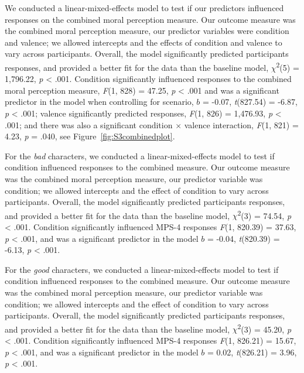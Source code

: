 \documentclass[
  man,floatsintext]{apa6}
\begin{document}
We conducted a linear-mixed-effects model to test if our predictors influenced responses on the combined moral perception measure. Our outcome measure was the combined moral perception measure, our predictor variables were condition and valence; we allowed intercepts and the effects of condition and valence to vary across participants.
Overall, the model significantly predicted participants responses, and provided a better fit for the data than the baseline model,
\(\chi\)\textsuperscript{2}(5) = 1,796.22, \emph{p} \textless{} .001.
Condition significantly influenced responses to the combined moral perception measure,
\emph{F}(1, 828) = 47.25, \emph{p} \textless{} .001
and was a significant predictor in the model when controlling for scenario, \(b\) = -0.07, \emph{t}(827.54) = -6.87, \emph{p} \textless{} .001;
valence significantly predicted responses,
\emph{F}(1, 826) = 1,476.93, \emph{p} \textless{} .001;
and there was also a significant condition \(\times\) valence interaction,
\emph{F}(1, 821) = 4.23, \emph{p} = .040, see Figure~\ref{fig:S3combinedplot}.

For the \emph{bad} characters, we conducted a linear-mixed-effects model to test if condition influenced responses to the combined measure. Our outcome measure was the combined moral perception measure, our predictor variable was condition; we allowed intercepts and the effect of condition to vary across participants. Overall, the model significantly predicted participants responses, and provided a better fit for the data than the baseline model, \(\chi\)\textsuperscript{2}(3) = 74.54, \emph{p} \textless{} .001. Condition significantly influenced MPS-4 responses \emph{F}(1, 820.39) = 37.63, \emph{p} \textless{} .001, and was a significant predictor in the model \(b\) = -0.04, \emph{t}(820.39) = -6.13, \emph{p} \textless{} .001.

For the \emph{good} characters, we conducted a linear-mixed-effects model to test if condition influenced responses to the combined measure. Our outcome measure was the combined moral perception measure, our predictor variable was condition; we allowed intercepts and the effect of condition to vary across participants. Overall, the model significantly predicted participants responses, and provided a better fit for the data than the baseline model, \(\chi\)\textsuperscript{2}(3) = 45.20, \emph{p} \textless{} .001. Condition significantly influenced MPS-4 responses \emph{F}(1, 826.21) = 15.67, \emph{p} \textless{} .001, and was a significant predictor in the model \(b\) = 0.02, \emph{t}(826.21) = 3.96, \emph{p} \textless{} .001.
\end{document}
